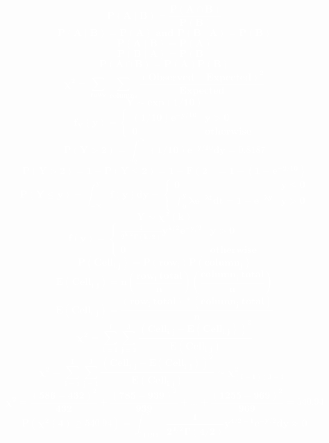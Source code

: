 \documentclass[12pt,portrait,semhelv,semrot]{article}
\begin{document}
	\normalsize

\textcolor{white}{\textbf{
$$\boldsymbol{P(A \mid B)  = \frac{P(A \cap B)}{P(B)} }$$
$$\boldsymbol{P(A \mid B)  = P(A) \mbox{ and } P(B\mid A) = P(B)}$$
$$\boldsymbol{P(A \mid B)  = P(A)}$$
$$\boldsymbol{P(B\mid A) = P(B)}$$
$$\boldsymbol{P(A\cap B) = P(A)P(B)}$$
$$\boldsymbol{\chi^2 = \sum_{rows}\sum_{columns}\frac{(Observed-Expected)^2}{Expected}}$$
$$\boldsymbol{Y\sim exp(1/10)}$$
$$\boldsymbol{f_Y(y) = \begin{cases} (1/10)e^{-y/10} & y >0 \\ 0 & otherwise\end{cases}}$$
$$\boldsymbol{P(Y>2) = \int_2^{\infty}(1/10)e^{-y/10}dy = 0.8187}$$
$$\boldsymbol{P(Y>2) = 1-P(Y\leq 2) = 1-F(2) = 1-(1 - e^{-2/10})}$$
$$\boldsymbol{P(Y\leq y) = \int_{-\infty}^yf(y)dy = \begin{cases} 0 & y\leq 0\\ \int_0^{y} \lambda e^{-\lambda t}dt = 1-e^{-\lambda y} & y > 0\end{cases}}$$
$$\boldsymbol{Y\sim \chi^2(k)}$$
$$\boldsymbol{f(y) = \begin{cases}\frac{1}{2^{k/2}\Gamma(k/2)}y^{k/2}e^{-y/2} & y>0 \\ 0 & otherwise\end{cases}}$$
$$\boldsymbol{P(Cell_{i,j}) = P(row_i)P(column_j)}$$
$$\boldsymbol{E(Cell_{i,j}) = n\left(\frac{row_i~total}{n}\right)\left(\frac{column_j~total}{n}\right)}$$
$$\boldsymbol{E(Cell_{i,j}) = \frac{(row_i~total)*(column_j~total)}{n}}$$
$$\boldsymbol{\chi^2 = \sum_{i = 1}^I\sum_{j =1}^J\frac{(Cell_{i,j}-E(Cell_{i,j}))^2}{E(Cell_{i,j})}}$$
$$\boldsymbol{\chi^2 = \sum_{i = 1}^I\sum_{j =1}^J\frac{(Cell_{i,j}-E(Cell_{i,j}))^2}{E(Cell_{i,j})}\sim\chi^2_{(I-1)(J-1)}}$$
$$\boldsymbol{\chi^2 = \frac{(586-432)^2}{432} + \frac{(785-939)^2}{939} + ... + \frac{(1255-969)^2}{969} = 540.94}$$
$$\boldsymbol{P(\chi^2(4) \geq 540.94) = \int_{540.94}^{\infty}\frac{1}{2^{4/2}\Gamma(4/2)}y^{4/2-1}e^{-y/2}dy \approx 0}$$
}}
\end{document}
